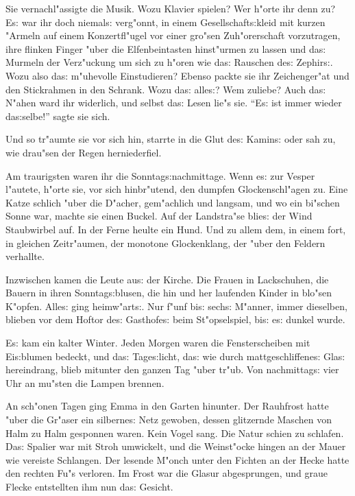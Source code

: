 \documentclass[oneside,12pt]{book}
\newcommand{\s}{s:}%
\begin{document}
Sie vernachl"assigte die Musik. Wozu Klavier spielen? Wer h"orte
ihr denn zu? E{\s} war ihr doch niemal{\s} verg"onnt, in einem
Gesellschaft{\s}kleid mit kurzen "Armeln auf einem Konzertfl"ugel
vor einer gro"sen Zuh"orerschaft vorzutragen, ihre flinken Finger
"uber die Elfenbeintasten hinst"urmen zu lassen und da{\s} Murmeln
der Verz"uckung um sich zu h"oren wie da{\s} Rauschen de{\s}
Zephir{\s}. Wozu also da{\s} m"uhevolle Einstudieren? Ebenso
packte sie ihr Zeichenger"at und den Stickrahmen in den Schrank.
Wozu da{\s} alle{\s}? Wem zuliebe? Auch da{\s} N"ahen ward ihr
widerlich, und selbst da{\s} Lesen lie"s sie. "`E{\s} ist immer
wieder da{\s}selbe!"' sagte sie sich.

Und so tr"aumte sie vor sich hin, starrte in die Glut de{\s}
Kamin{\s} oder sah zu, wie drau"sen der Regen herniederfiel.

Am traurigsten waren ihr die Sonntag{\s}nachmittage. Wenn e{\s}
zur Vesper l"autete, h"orte sie, vor sich hinbr"utend, den dumpfen
Glockenschl"agen zu. Eine Katze schlich "uber die D"acher,
gem"achlich und langsam, und wo ein bi"schen Sonne war, machte sie
einen Buckel. Auf der Landstra"se blie{\s} der Wind Staubwirbel
auf. In der Ferne heulte ein Hund. Und zu allem dem, in einem
fort, in gleichen Zeitr"aumen, der monotone Glockenklang, der
"uber den Feldern verhallte.

Inzwischen kamen die Leute au{\s} der Kirche. Die Frauen in
Lackschuhen, die Bauern in ihren Sonntag{\s}blusen, die hin und
her laufenden Kinder in blo"sen K"opfen. Alle{\s} ging
heimw"art{\s}. Nur f"unf bi{\s} sech{\s} M"anner, immer dieselben,
blieben vor dem Hoftor de{\s} Gasthofe{\s} beim St"opselspiel,
bi{\s} e{\s} dunkel wurde.

E{\s} kam ein kalter Winter. Jeden Morgen waren die
Fensterscheiben mit Ei{\s}blumen bedeckt, und da{\s}
Tage{\s}licht, da{\s} wie durch mattgeschliffene{\s} Gla{\s}
hereindrang, blieb mitunter den ganzen Tag "uber tr"ub. Von
nachmittag{\s} vier Uhr an mu"sten die Lampen brennen.

An sch"onen Tagen ging Emma in den Garten hinunter. Der Rauhfrost
hatte "uber die Gr"aser ein silberne{\s} Netz gewoben, dessen
glitzernde Maschen von Halm zu Halm gesponnen waren. Kein Vogel
sang. Die Natur schien zu schlafen. Da{\s} Spalier war mit Stroh
umwickelt, und die Weinst"ocke hingen an der Mauer wie vereiste
Schlangen. Der lesende M"onch unter den Fichten an der Hecke hatte
den rechten Fu"s verloren. Im Frost war die Glasur abgesprungen,
und graue Flecke entstellten ihm nun da{\s} Gesicht.
\end{document}
